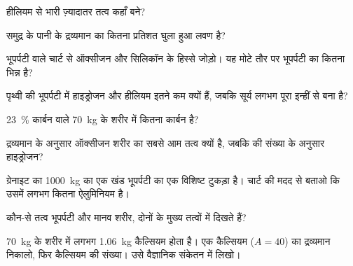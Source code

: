 \begin{exercise}[$\star$]\label{exo:g9:elements-universe-earth:3}
हीलियम से भारी ज़्यादातर तत्व कहाँ बने?
\end{exercise}

\begin{exercise}[$\star$]\label{exo:g9:elements-universe-earth:4}
समुद्र के पानी के द्रव्यमान का कितना प्रतिशत घुला हुआ लवण है?
\end{exercise}

\begin{exercise}[$\star\star$]\label{exo:g9:elements-universe-earth:5}
भूपर्पटी वाले चार्ट से ऑक्सीजन और सिलिकॉन के हिस्से जोड़ो। यह मोटे तौर पर
भूपर्पटी का कितना भिन्न है?
\end{exercise}

\begin{exercise}[$\star\star$]\label{exo:g9:elements-universe-earth:6}
पृथ्वी की भूपर्पटी में हाइड्रोजन और हीलियम इतने कम क्यों हैं, जबकि सूर्य लगभग पूरा
इन्हीं से बना है?
\end{exercise}

\begin{exercise}[$\star\star$]\label{exo:g9:elements-universe-earth:7}
\qty{23}{\percent} कार्बन वाले \qty{70}{kg} के शरीर में कितना कार्बन
है?
\end{exercise}

\begin{exercise}[$\star\star$]\label{exo:g9:elements-universe-earth:8}
द्रव्यमान के अनुसार ऑक्सीजन शरीर का सबसे आम तत्व क्यों है, जबकि  की संख्या
के अनुसार हाइड्रोजन?
\end{exercise}

\begin{exercise}[$\star\star$]\label{exo:g9:elements-universe-earth:9}
ग्रेनाइट का \qty{1000}{kg} का एक खंड भूपर्पटी का एक विशिष्ट टुकड़ा है। चार्ट
की मदद से बताओ कि उसमें लगभग कितना ऐलुमिनियम है।
\end{exercise}

\begin{exercise}[$\star\star$]\label{exo:g9:elements-universe-earth:10}
कौन-से तत्व भूपर्पटी और मानव शरीर, दोनों के मुख्य तत्वों में
दिखते हैं?
\end{exercise}

\begin{exercise}[$\star\star\star$]\label{exo:g9:elements-universe-earth:11}
\qty{70}{kg} के शरीर में लगभग \qty{1.06}{kg} कैल्सियम होता है। एक कैल्सियम
 ($A = 40$) का द्रव्यमान निकालो, फिर कैल्सियम  की संख्या।
उसे वैज्ञानिक संकेतन में लिखो।
\end{exercise}

